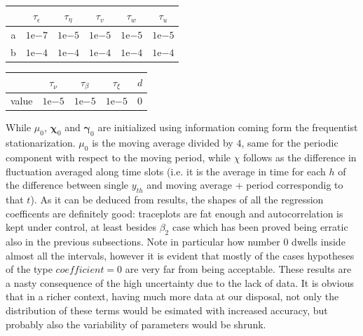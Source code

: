 \documentclass[11pt,twoside]{report}
\begin{document}
\begin{table}[!htb]
	\begin{subtable}{.5\linewidth}
		\centering
		\begin{tabular}{|c|c|c|c|c|c|}
			\hline
			& $ \tau_\epsilon $ & $ \tau_\eta $ &$  \tau_v $ & $ \tau_w $ & $ \tau_ u $\\
			\hline
			a &$  1\mathrm{e}{-7} $ & $  1\mathrm{e}{-5} $ &$  1\mathrm{e}{-5} $&$  1\mathrm{e}{-5} $&$  1\mathrm{e}{-5} $\\
			\hline
			b &$  1\mathrm{e}{-4} $ & $  1\mathrm{e}{-4} $ &$  1\mathrm{e}{-4} $&$  1\mathrm{e}{-4} $&$  1\mathrm{e}{-4} $\\
			\hline
		\end{tabular} 
	\end{subtable}%
	\begin{subtable}{.5\linewidth}
		\centering
		\begin{tabular}{|c|c|c|c|c|}
			\hline
			& $ \tau_\nu $ & $ \tau_\beta $ & $ \tau_\xi $ & $ d $\\
			\hline
			value &$  1\mathrm{e}{-5} $ & $  1\mathrm{e}{-5} $& $ 1\mathrm{e}{-5} $ & 0\\
			\hline
		\end{tabular} 
	\end{subtable} 
\end{table}

While $ \mu_0 $, $ \boldsymbol{\chi}_{0} $ and $ \boldsymbol{\gamma}_{0} $ are initialized using information coming form the frequentist stationarization. $ \mu_0 $ is the moving average divided by $ 4 $, same for the periodic component with respect to the moving period, while $ \chi $ follows as the difference in fluctuation averaged  along time slots (i.e. it is the average in time for each $ h $ of the difference between single $ y_{th} $ and moving average + period correspondig to that $ t $). As it can be deduced from results, the shapes of all the regression coefficents are definitely good: traceplots are fat enough and autocorrelation is kept under control, at least besides $\beta_2$ case which has been proved being erratic also in the previous subsections. Note in particular how number 0 dwells inside almost all the intervals, however it is evident that mostly of the cases hypotheses of the type $ coefficient=0 $ are very far from being acceptable. These results are a nasty consequence of the high uncertainty due to the lack of data. It is obvious that in a richer context, having much more data at our disposal, not only the distribution of these terms would be esimated with increased accuracy, but probably also the variability of parameters would be shrunk. 
\end{document}

